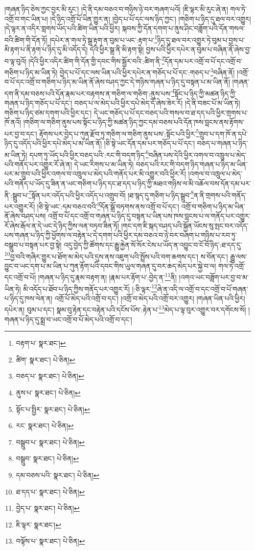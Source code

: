 །གཞན་ཉིད་ཅེས་ཀྱང་བྱར་མི་རུང་། །དེ་ནི་དམ་བཅའ་བ་གཉིས་ཉེ་བར་གཞག་པའོ། །ཇི་ལྟར་མི་རུང་ཞེ་ན། གལ་ཏེ་འགྲོ་བ་གང་ཡིན་པ། །དེ་ཉིད་འགྲོ་པོ་ཡིན་གྱུར་ན། །བྱེད་པ་པོ་དང་ལས་ཉིད་ཀྱང་། །གཅིག་པ་ཉིད་དུ་ཐལ་བར་འགྱུར། །དེ་ལྟར་ན་འདིར་གླགས་ཡོད་པའི་ཚིག་ཡིན་པའི་ཕྱིར། སྐབས་ཀྱི་དོན་དགག་པ་ནུས་ཤིང་བཟློག་པའི་དོན་གསལ་བའི་ཚིག་གི་དོན་ཏོ། །དཔེར་ན་གལ་ཏེ་སྒྲ་རྟག་ན་བུམ་པ་ཡང་:རྟག་པ་\footnote{བརྟག་པ་  སྣར་ཐང་། }ཉིད་དུ་ཐལ་བར་འགྱུར་ཏེ་བུམ་པ་བྱས་པ་མི་རྟག་པ་ནི་རྟག་པ་ཉིད་དུ་མི་འདོད་དེ། དེའི་ཕྱིར་སྒྲ་ནི་མི་རྟག་སྟེ། བྱས་པའི་ཕྱིར་དཔེར་ན་བུམ་པ་བཞིན་ནོ་ཞེས་བྱ་བ་ལྟ་བུའོ། །དེའི་ཕྱིར་འདིར་ཚིག་གི་དོན་གྱི་དབང་གིས་སྦྱོར་བའི་:ཚིག་ནི་\footnote{ཚིག་  སྣར་ཐང་།  པེ་ཅིན། }དོན་དམ་པར་འགྲོ་བ་པོ་དང་འགྲོ་བ་གཅིག་པ་ཉིད་མ་ཡིན་ཏེ། བྱེད་པ་པོ་དང་ལས་ཡིན་པའི་ཕྱིར་དཔེར་ན་གཅོད་པ་པོ་དང་:གཅད་པ་\footnote{བཅད་པ་  སྣར་ཐང་།  པེ་ཅིན། }བཞིན་ནོ། །འགྲོ་བ་པོ་དང་འགྲོ་བ་གཅིག་པ་ཉིད་མ་ཡིན་ནོ་ཞེས་བཤད་ཀྱང་དེ་གཉིས་གཞན་པ་ཉིད་དུ་བསྟན་པ་མ་ཡིན་ནོ། །གཞན་དག་ནི་དམ་བཅས་པའི་དོན་རྣམ་པར་བརྟགས་ན་གཅིག་ལ་གཅིག་:ནུས་པས་\footnote{ནུས་པ་  སྣར་ཐང་།  པེ་ཅིན། }སྟོང་པ་ཉིད་ཀྱི་མཚན་ཉིད་ཀྱི་གཞན་པ་ཉིད་གཅོད་པ་པོ་དང་། བཅད་པ་ལ་མེད་པའི་ཕྱིར་དཔེ་མེད་དོ་ཞེས་ཟེར་རོ། །དེ་ནི་བཟང་པོ་མ་ཡིན་ཏེ། གཅིག་པ་ཉིད་ཙམ་དགག་པའི་ཕྱིར་དང་། དེ་ཡང་གཅོད་པ་པོ་དང་བཅད་པའི་གསལ་བ་ཐ་དད་པའི་ཕྱིར་གྲགས་པ་ཁོ་ནའོ། །གཅིག་ལ་གཅིག་ནུས་པས་སྟོང་པ་ཉིད་ཀྱི་མཚན་ཉིད་ཀྱང་དམ་བཅས་པའི་དོན་ཁས་བླངས་ནས་རྟོགས་པར་བྱ་བ་དང་། རྟོགས་པར་བྱེད་པ་ཀུན་རྫོབ་ཏུ་གཅིག་ལ་གཅིག་ནུས་པས་:སྟོང་པའི་ཕྱིར་\footnote{སྟོང་པ་སྤྱིར་  སྣར་ཐང་།  པེ་ཅིན། }གྲུབ་པ་དག་ཁོ་ན་དཔེ་ཉིད་དུ་འདོད་པའི་ཕྱིར་དཔེ་མེད་པ་མ་ཡིན་ནོ། །ཅི་སྟེ་ཡང་དོན་དམ་པར་གཅོད་པ་པོ་དང་། བཅད་པ་གཞན་པ་ཉིད་མ་ཡིན་ཏེ། དཔག་ཏུ་ཡོད་པའི་ཕྱིར་བཅད་པའི་:རང་གི་བདག་ཉིད་\footnote{རང་  སྣར་ཐང་།  པེ་ཅིན། }བཞིན་པས་དེའི་ཕྱིར་འགལ་བ་འཁྲུལ་པ་མེད་པའི་གནོད་པར་འགྱུར་རོ་ཞེ་ན། དེ་ཡང་རིགས་པ་མ་ཡིན་ཏེ། བཅད་པའི་རང་གི་བདག་ཉིད་གཞན་པ་ཉིད་མ་ཡིན་པར་མ་གྲུབ་པའི་ཕྱིར་འགལ་བ་འཁྲུལ་པ་མེད་པའི་གནོད་པར་མི་འགྱུར་བའི་ཕྱིར་རོ། །འགལ་བ་འཁྲུལ་པ་མེད་པའི་གནོད་པ་ཡོད་དུ་ཟིན་ན་ཡང་གཅིག་པ་ཉིད་དང་ཐ་དད་པ་ཉིད་ཀྱི་མཐའ་གཉིས་ལ་མི་འཆོལ་བས་དོན་དམ་པར་ནི་:སྒྲུབ་པ་\footnote{བསྒྲུབ་པ་  སྣར་ཐང་།  པེ་ཅིན། }སྟོན་པར་འདོད་པའི་ཕྱིར་འདོད་པ་འགྲུབ་བོ། །ཐ་སྙད་དུ་གཅིག་པ་ཉིད་སྒྲུབ་\footnote{བསྒྲུབ་  སྣར་ཐང་།  པེ་ཅིན། }ན་ནི་གྲགས་པའི་གནོད་པར་འགྱུར་རོ། །ཅི་སྟེ་ཡང་:དམ་བཅའ་བའི་\footnote{དམ་བཅས་པའི་  སྣར་ཐང་།  པེ་ཅིན། }དོན་སྒྲོ་བཏགས་ནས་འགྲོ་བ་པོ་དང་། འགྲོ་བ་གཅིག་པ་ཉིད་མ་ཡིན་ནོ་ཞེས་བཤད་པས། འགྲོ་བ་པོ་དང་འགྲོ་བ་གཞན་པ་ཉིད་དུ་བསྟན་པ་ཡིན་པས་ཁས་བླངས་པ་ལ་གནོད་པར་འགྱུར་རོ་ཞེས་རྒོལ་ན་དེ་ཡང་དེ་ཉིད་ཀྱིས་ལན་བཏབ་ཟིན་ཏོ། །གང་དག་ཇི་སྐད་བཤད་པའི་སྐྱོན་ཡོངས་སུ་སྤང་བར་འདོད་པས་གཞན་པ་ཉིད་ཀྱི་ཕྱོགས་ལ་བརྟེན་པ་དེ་དགག་པའི་ཕྱིར་དམ་བཅའ་བ་ཉེ་བར་བཞག་པ་གཉིས་པ་རབ་ཏུ་བསྒྲུབ་པ་བསྟན་པར་བྱ་སྟེ། འདུ་བྱེད་ཀྱི་ཚོགས་དང་རྒྱུ་རྐྱེན་སོ་སོར་ངེས་པ་ཡོད་ན་འབྱུང་བ་ངོ་བོ་ཉིད་:ཐ་དད་དུ་\footnote{ཐ་དད་པ་  སྣར་ཐང་།  པེ་ཅིན། }བྱ་བའི་གཞིར་གྱུར་པ་ཐོག་མ་མེད་པའི་དུས་ནས་འཇུག་པའི་སྤྲོས་པའི་བག་ཆགས་དང་། ས་བོན་དང་། རྒྱུ་ལས་བྱུང་བ་ཡང་དག་པ་མ་ཡིན་པ་ཀུན་རྟོག་པའི་དབང་གིས་ཡུལ་གཞན་དུ་བར་ཆད་མེད་པར་སྐྱེ་བ་ལ། གལ་ཏེ་འགྲོ་དང་འགྲོ་བ་པོ། །གཞན་པ་ཉིད་དུ་རྣམ་བརྟག་ན། །རྣམ་པར་རྟོག་པ་:བྱེད་ན་\footnote{བྱེད་པ་  སྣར་ཐང་།  པེ་ཅིན། }ནི། །འགའ་ཡང་བཟློག་པར་བྱ་བ་མ་ཡིན་ཏེ། མི་འདོད་པ་ཐོབ་པ་ཉིད་ཀྱིས་གནོད་པར་འགྱུར་རོ། །:ཅི་ལྟར་\footnote{ཇི་ལྟར་  སྣར་ཐང་། }ཞེ་ན་འདི་ལ་འགྲོ་བ་དང་འགྲོ་བ་པོ་གཞན་པ་ཉིད་དུ་ཁས་ལེན་ན། འགྲོ་པོ་མེད་པའི་འགྲོ་བ་དང་། །འགྲོ་བ་མེད་པའི་འགྲོ་བར་འགྱུར། །གཞན་ཡིན་པའི་ཕྱིར། དཔེར་ན། བུམ་པ་དང་། སྣམ་བུ་རྟེན་དང་བརྟེན་པའི་དངོས་པོས་:རྟེན་པ་\footnote{བལྟོས་པ་  སྣར་ཐང་།  པེ་ཅིན། }མེད་པ་ལྟ་བུར་འགྱུར་བར་དགོངས་སོ། །གཞན་པ་ཉིད་དུ་སྨྲ་བ་ཡང་འགྲོ་བ་པོ་མེད་པའི་འགྲོ་བ་དང་། 